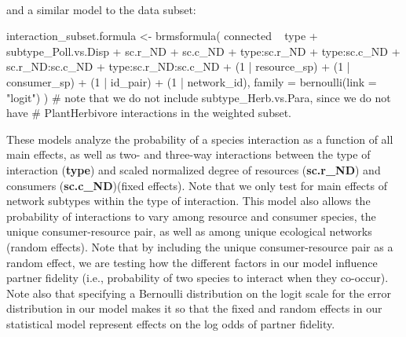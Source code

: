 \documentclass[11pt,]{article}
\newenvironment{Shaded}{}{}
\newcommand{\KeywordTok}[1]{\textcolor[rgb]{0.00,0.00,1.00}{#1}}
\newcommand{\DataTypeTok}[1]{#1}
\newcommand{\DecValTok}[1]{#1}
\newcommand{\StringTok}[1]{\textcolor[rgb]{0.00,0.50,0.50}{#1}}
\newcommand{\CommentTok}[1]{\textcolor[rgb]{0.00,0.50,0.00}{#1}}
\newcommand{\OperatorTok}[1]{#1}
\newcommand{\NormalTok}[1]{#1}
\begin{document}
~

and a similar model to the data subset:

\begin{Shaded}
\begin{Highlighting}[]
\NormalTok{interaction_subset.formula <-}\StringTok{ }\KeywordTok{brmsformula}\NormalTok{(}
\NormalTok{  connected }\OperatorTok{~}\StringTok{ }\NormalTok{type }\OperatorTok{+}\StringTok{ }\NormalTok{subtype_Poll.vs.Disp }\OperatorTok{+}\StringTok{ }\NormalTok{sc.r_ND }\OperatorTok{+}\StringTok{ }\NormalTok{sc.c_ND }\OperatorTok{+}\StringTok{ }
\StringTok{    }\NormalTok{type}\OperatorTok{:}\NormalTok{sc.r_ND }\OperatorTok{+}\StringTok{ }\NormalTok{type}\OperatorTok{:}\NormalTok{sc.c_ND }\OperatorTok{+}\StringTok{ }\NormalTok{sc.r_ND}\OperatorTok{:}\NormalTok{sc.c_ND }\OperatorTok{+}
\StringTok{    }\NormalTok{type}\OperatorTok{:}\NormalTok{sc.r_ND}\OperatorTok{:}\NormalTok{sc.c_ND }\OperatorTok{+}
\StringTok{    }\NormalTok{(}\DecValTok{1} \OperatorTok{|}\StringTok{ }\NormalTok{resource_sp) }\OperatorTok{+}\StringTok{ }\NormalTok{(}\DecValTok{1} \OperatorTok{|}\StringTok{ }\NormalTok{consumer_sp) }\OperatorTok{+}\StringTok{ }\NormalTok{(}\DecValTok{1} \OperatorTok{|}\StringTok{ }\NormalTok{id_pair) }\OperatorTok{+}\StringTok{ }\NormalTok{(}\DecValTok{1} \OperatorTok{|}\StringTok{ }\NormalTok{network_id),}
  \DataTypeTok{family =} \KeywordTok{bernoulli}\NormalTok{(}\DataTypeTok{link =} \StringTok{"logit"}\NormalTok{) }
\NormalTok{) }\CommentTok{# note that we do not include subtype_Herb.vs.Para, since we do not have}
\CommentTok{# PlantHerbivore interactions in the weighted subset.}
\end{Highlighting}
\end{Shaded}

These models analyze the probability of a species interaction as a
function of all main effects, as well as two- and three-way interactions
between the type of interaction (\textbf{type}) and scaled normalized
degree of resources (\textbf{sc.r\_ND}) and consumers
(\textbf{sc.c\_ND})(fixed effects). Note that we only test for main
effects of network subtypes within the type of interaction. This model
also allows the probability of interactions to vary among resource and
consumer species, the unique consumer-resource pair, as well as among
unique ecological networks (random effects). Note that by including the
unique consumer-resource pair as a random effect, we are testing how the
different factors in our model influence partner fidelity (i.e.,
probability of two species to interact when they co-occur). Note also
that specifying a Bernoulli distribution on the logit scale for the
error distribution in our model makes it so that the fixed and random
effects in our statistical model represent effects on the log odds of
partner fidelity.
\end{document}
